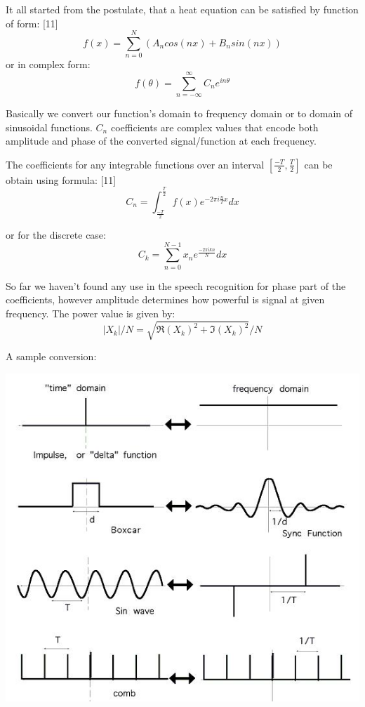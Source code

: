 \documentclass[12pt,a4paper,english]{article}
\begin{document}
It all started from the postulate, that a heat equation can be satisfied by function of form: [11] \newline
\begin{equation}
    f(x)=\sum_{n=0}^N(A_n cos(nx) + B_n sin(nx))
\end{equation}
or in complex form:
\begin{equation}
    f(\theta)=\sum_{n=-\infty}^{\infty} C_n e^{i n \theta}
\end{equation}

Basically we convert our function's domain to frequency domain or to domain of sinusoidal functions. $C_n$ coefficients are complex values that encode both amplitude and phase of the converted signal/function at each frequency. \newline

The coefficients for any integrable functions over an interval $[\frac{-T}{2}, \frac{T}{2}]$ can be obtain using formula: [11] \newline
\begin{equation}
    C_n=\int_{\frac{-T}{2}}^{\frac{T}{2}} f(x) e^{-2 \pi i \frac{n}{T} x} dx
\end{equation}

or for the discrete case:
\begin{equation}
    C_k=\sum_{n=0}^{N-1} x_n e^{\frac{-2 \pi i k n}{N}} dx
\end{equation}
	

So far we haven't found any use in the speech recognition for phase part of the coefficients, however amplitude determines how powerful is signal at given frequency. The power value is given by:
\begin{equation}
    |X_k|/N = \sqrt{\Re(X_k)^2 + \Im(X_k)^2} / N
\end{equation}

\newpage
A sample conversion:
\begin{center}
    \includegraphics[scale=0.3]{sample_dft_conversion.jpg}
\end {center}
\end{document}
